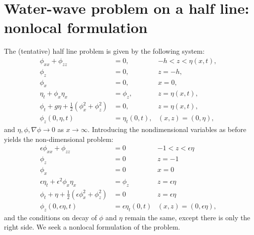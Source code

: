 \documentclass[10pt,reqno,oneside,a4paper]{article}
\begin{document}
\section{Water-wave problem on a half line: nonlocal formulation}
The (tentative) half line problem is given by the following system:
\begin{subequations}\label{DimHalfLineProblem}
\begin{align}
\phi_{xx} + \phi_{zz} &= 0, &-h < z < \eta(x,t), \\
\phi_{z} &= 0, &z = -h, \\
\phi_{x} &= 0, &x =0, \\
\eta_t + \phi_{x}\eta_{x} &= \phi_{z}, & z = \eta(x,t), \\
\phi_t + g\eta + \frac{1}{2}(\phi_{x}^2 + \phi_{z}^2) &= 0, &z = \eta(x,t), \\
\phi_{z}(0,\eta,t) &= \eta_t(0,t), &(x,z) = (0,\eta),
\end{align}
\end{subequations}
and $\eta, \phi, \nabla \phi \to 0$ as $x \to \infty.$ Introducing the nondimensional variables as before yields the non-dimensional problem:
\begin{subequations} \label{NondimHalfLineProblem}
\begin{align}
\label{NondimPDE}\epsilon\phi_{xx} + \phi_{zz} &= 0 &-1 < z < \epsilon\eta \\
\label{NondimBC1}\phi_{z} &= 0 &z = -1 \\
\label{NondimBC2}\phi_{x} &= 0 &x =0 \\
\label{NondimBC3}\epsilon\eta_t + \epsilon^2 \phi_{x}\eta_{x} &= \phi_{z} & z = \epsilon\eta\\
\label{NondimBC4}\phi_t + \eta + \frac{1}{2}(\epsilon\phi_{x}^2 + \phi_{z}^2) &= 0 &z = \epsilon\eta \\
\label{NondimBC5}\phi_{z}(0,\epsilon\eta,t) &= \epsilon\eta_t(0,t) &(x,z) = (0,\epsilon\eta),
\end{align}
\end{subequations}
and the conditions on decay of $\phi$ and $\eta$ remain the same, except there is only the right side. We seek a nonlocal formulation of the problem.
\end{document}
